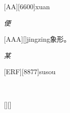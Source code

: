 \begin{Lemma} %
	[AA][6600]{xuan}{}
	\pro{}\Etymology{}\pro{}\lipsum
	\begin{mainenum}
		\mitem \textsl{便} \en{}
		\E{\e \e \e }
		\mitem  \en{}
		\E{\e \e \e }
		\mitem  \en{}
		\E{\e \e \e }
		\mitem  \en{}
		\E{\e \e \e }
		\mitem  \en{}
		\E{\e \e \e }
		\mitem  \en{}
		\E{\e \e \e }
	\end{mainenum}
\end{Lemma}

\begin{Lemma} %
	[AAA][]{jing}{zing}象形。
	\Etymology{}\pro{}\lipsum
	\begin{mainenum}
		\mitem \textsl{某} \en{}
		\E{\e \e \e }
		\mitem  \en{}
		\E{\e \e \e }
		\mitem  \en{}
		\E{\e \e \e }
		\mitem  \en{}
		\E{\e \e \e }
		\mitem  \en{}
		\E{\e \e \e }
		\mitem  \en{}
		\E{\e \e \e }
	\end{mainenum}
\end{Lemma}

\begin{Lemma} %
	[ERF][8877]{su}{sou\SP{2}}
	\pro{}\lipsum
	\begin{mainenum}
		\mitem \textsl{𡎳} \en{}
		\E{\e \e \e }
		\mitem  \en{}
		\E{\e \e \e }
		\mitem  \en{}
		\E{\e \e \e }
	\end{mainenum}
\end{Lemma}

\begin{Lemma} %
	\centry[][]{}[][]{\SP{}}{\SP{}}
	\pro{}\lipsum
	\begin{mainenum}
		\mitem  \en{}
		\E{\e \e \e }
		\mitem  \en{}
		\E{\e \e \e }
		\mitem  \en{}
		\E{\e \e \e }
	\end{mainenum}
\end{Lemma}

